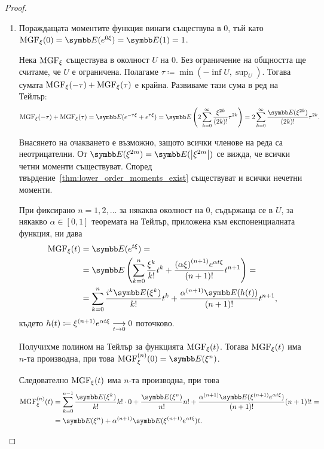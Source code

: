 \documentclass[numbers=endperiod, bibliography=totocnumbered]{scrartcl}
\begin{document}
\begin{proof}
  \mbox{}
  \begin{enumerate}
    \item Пораждащата моментите функция винаги съществува в \( 0 \), тъй като \( \MGF_\xi(0) = \Expect(e^{0\xi}) = \Expect(1) = 1 \).

    Нека \( \MGF_\xi \) съществува в околност \( U \) на \( 0 \). Без ограничение на общността ще считаме, че \( U \) е ограничена. Полагаме \( \tau \coloneqq \min(-\inf U, \sup_U) \). Тогава сумата \( \MGF_\xi(-\tau) + \MGF_\xi(\tau) \) е крайна. Развиваме тази сума в ред на Тейлър:
    \begin{equation*}
      \MGF_\xi(-\tau) + \MGF_\xi(\tau)
      =
      \Expect(e^{-\tau\xi} + e^{\tau\xi})
      =
      \Expect\left( 2 \sum_{k=0}^\infty \frac {\xi^{2k}} {(2k)!} \tau^{2k} \right)
      =
      2 \sum_{k=0}^\infty \frac {\Expect(\xi^{2k})} {(2k)!} \tau^{2k}.
    \end{equation*}

    Внасянето на очакването е възможно, защото всички членове на реда са неотрицателни. От \( \Expect(\xi^{2m}) = \Expect(\Abs{\xi^{2m}}) \) се вижда, че всички четни моменти съществуват. Според твърдение~\ref{thm:lower_order_moments_exist} съществуват и всички нечетни моменти.

    При фиксирано \( n = 1, 2, \ldots \) за някаква околност на \( 0 \), съдържаща се в \( U \), за някакво \( \alpha \in [0, 1] \) теоремата на Тейлър, приложена към експоненциалната функция, ни дава
    \begin{align*}
      \MGF_\xi(t)
      &=
      \Expect(e^{t\xi})
      = \\ &=
      \Expect\left(\sum_{k=0}^n \frac {\xi^k} {k!} t^k + \frac {{(\alpha \xi)}^{(n+1)} e^{\alpha t \xi}} {(n+1)!} t^{n+1} \right)
      = \\ &=
      \sum_{k=0}^n \frac {i^k \Expect(\xi^k)} {k!} t^k + \frac {{\alpha}^{(n+1)} \Expect(h(t))} {(n+1)!} t^{n+1},
    \end{align*}
    където \( h(t) \coloneqq \xi^{(n+1)} e^{\alpha t \xi} \Conv[t \to 0]{} 0 \) поточково.

    Получихме полином на Тейлър за функцията \( \MGF_\xi(t) \). Тогава \( \MGF_\xi(t) \) има \( n \)-та производна, при това \( \MGF^{(n)}_\xi(0) = \Expect(\xi^n) \).

    Следователно \( \MGF_\xi(t) \) има \( n \)-та производна, при това
    \begin{align*}
      \MGF^{(n)}_\xi(t)
      &=
      \sum_{k=0}^{n-1} \frac {\Expect(\xi^k)} {k!} k! \cdot 0 + \frac {\Expect(\xi^n)} {n!} n! + \frac {\alpha^{(n+1)} \Expect(\xi^{(n+1)} e^{\alpha t \xi})} {(n+1)!} (n+1)! t
      = \\ &=
      \Expect(\xi^n) + \alpha^{(n+1)} \Expect(\xi^{(n+1)} e^{\alpha t \xi}) t.
    \end{align*}


\end{enumerate}
\end{proof}
\end{document}
